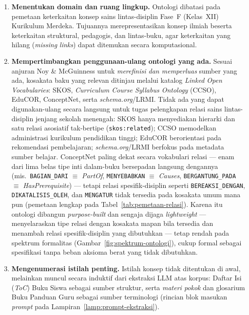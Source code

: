 \documentclass[../../thesis]{subfiles}
\begin{document}
\begin{enumerate}
  \item \textbf{Menentukan domain dan ruang lingkup.} Ontologi dibatasi pada
        pemetaan keterkaitan konsep sains lintas-disiplin Fase~F (Kelas~XII)
        Kurikulum Merdeka. Tujuannya merepresentasikan konsep ilmiah beserta
        keterkaitan struktural, pedagogis, dan lintas-buku, agar keterkaitan
        yang hilang (\textit{missing links}) dapat ditemukan secara
        komputasional.

  \item \textbf{Mempertimbangkan penggunaan-ulang ontologi yang ada.} Sesuai
        anjuran Noy \& McGuinness untuk \textit{merefinisi dan memperluas} sumber
        yang ada, kosakata baku yang relevan ditinjau melalui katalog
        \textit{Linked Open Vocabularies}: SKOS, \textit{Curriculum Course
        Syllabus Ontology} (CCSO), EduCOR, ConceptNet, serta
        \textit{schema.org}/LRMI. Tidak ada yang dapat digunakan-ulang secara
        langsung untuk tugas pelengkapan relasi sains lintas-disiplin jenjang
        sekolah menengah: SKOS hanya menyediakan hierarki dan satu relasi
        asosiatif tak-bertipe (\texttt{skos:related}); CCSO memodelkan
        administrasi kurikulum pendidikan tinggi; EduCOR berorientasi pada
        rekomendasi pembelajaran; \textit{schema.org}/LRMI berfokus pada metadata
        sumber belajar. ConceptNet paling dekat secara vokabulari relasi --- enam
        dari lima belas tipe inti dalam-buku bersepadan langsung dengannya (mis.\
        \texttt{BAGIAN\_DARI} $\equiv$ \textit{PartOf}, \texttt{MENYEBABKAN}
        $\equiv$ \textit{Causes}, \texttt{BERGANTUNG\_PADA} $\equiv$
        \textit{HasPrerequisite}) --- tetapi relasi spesifik-disiplin seperti
        \texttt{BEREAKSI\_DENGAN}, \texttt{DIKATALISIS\_OLEH}, dan
        \texttt{MENGATUR} tidak tersedia pada kosakata umum mana pun (pemetaan
        lengkap pada Tabel~\ref{tab:pemetaan-relasi}). Karena itu ontologi
        dibangun \textit{purpose-built} dan sengaja dijaga \textit{lightweight}
        --- menyelaraskan tipe relasi dengan kosakata mapan bila tersedia dan
        menambah relasi spesifik-disiplin yang dibutuhkan --- tetap rendah pada
        spektrum formalitas (Gambar~\ref{fig:spektrum-ontologi}), cukup formal
        sebagai spesifikasi tanpa beban aksioma berat yang tidak dibutuhkan.

  \item \textbf{Mengenumerasi istilah penting.} Istilah konsep tidak ditentukan
        di awal, melainkan muncul secara induktif dari ekstraksi LLM atas
        korpus: Daftar Isi (\textit{ToC}) Buku Siswa sebagai sumber struktur,
        serta \textit{materi pokok} dan glosarium Buku Panduan Guru sebagai
        sumber terminologi (rincian blok masukan \textit{prompt} pada
        Lampiran~\ref{lamp:prompt-ekstraksi}).


\end{enumerate}
\end{document}
